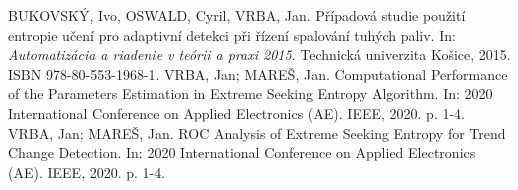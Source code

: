 \documentclass[11pt,twoside,openright]{report}
\begin{document}
\begin{thebibliography}{A}
BUKOVSKÝ, Ivo, OSWALD, Cyril, VRBA, Jan. Případová studie použití entropie učení pro adaptivní detekci při řízení spalování tuhých paliv. In: \textit{Automatizácia a riadenie v teórii a praxi 2015}. Technická univerzita Košice, 2015. ISBN 978-80-553-1968-1.
VRBA, Jan; MAREŠ, Jan. Computational Performance of the Parameters Estimation in Extreme Seeking Entropy Algorithm. In: 2020 International Conference on Applied Electronics (AE). IEEE, 2020. p. 1-4.
VRBA, Jan; MAREŠ, Jan. ROC Analysis of Extreme Seeking Entropy for Trend Change Detection. In: 2020 International Conference on Applied Electronics (AE). IEEE, 2020. p. 1-4.
\end{thebibliography}


\renewcommand{\bibname}{Literatura}
\begin{thebibliography}{L}


\end{thebibliography}
\end{document}
